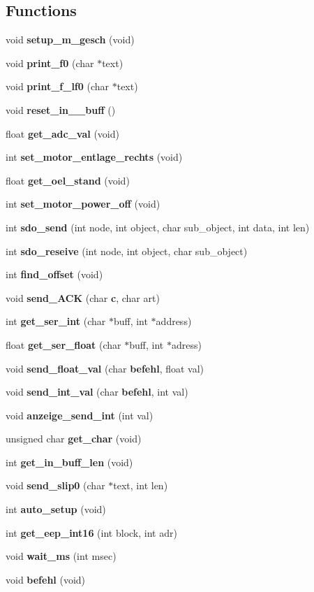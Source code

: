 \subsection*{Functions}
\begin{DoxyCompactItemize}
\item 
void \textbf{ setup\+\_\+m\+\_\+gesch} (void)
\item 
void \textbf{ print\+\_\+f0} (char $\ast$text)
\item 
void \textbf{ print\+\_\+f\+\_\+lf0} (char $\ast$text)
\item 
void \textbf{ reset\+\_\+in\+\_\+\_\+buff} ()
\item 
float \textbf{ get\+\_\+adc\+\_\+val} (void)
\item 
int \textbf{ set\+\_\+motor\+\_\+entlage\+\_\+rechts} (void)
\item 
float \textbf{ get\+\_\+oel\+\_\+stand} (void)
\item 
int \textbf{ set\+\_\+motor\+\_\+power\+\_\+off} (void)
\item 
int \textbf{ sdo\+\_\+send} (int node, int object, char sub\+\_\+object, int data, int len)
\item 
int \textbf{ sdo\+\_\+reseive} (int node, int object, char sub\+\_\+object)
\item 
int \textbf{ find\+\_\+offset} (void)
\item 
void \textbf{ send\+\_\+\+A\+CK} (char \textbf{ c}, char art)
\item 
int \textbf{ get\+\_\+ser\+\_\+int} (char $\ast$buff, int $\ast$address)
\item 
float \textbf{ get\+\_\+ser\+\_\+float} (char $\ast$buff, int $\ast$adress)
\item 
void \textbf{ send\+\_\+float\+\_\+val} (char \textbf{ befehl}, float val)
\item 
void \textbf{ send\+\_\+int\+\_\+val} (char \textbf{ befehl}, int val)
\item 
void \textbf{ anzeige\+\_\+send\+\_\+int} (int val)
\item 
unsigned char \textbf{ get\+\_\+char} (void)
\item 
int \textbf{ get\+\_\+in\+\_\+buff\+\_\+len} (void)
\item 
void \textbf{ send\+\_\+slip0} (char $\ast$text, int len)
\item 
int \textbf{ auto\+\_\+setup} (void)
\item 
int \textbf{ get\+\_\+eep\+\_\+int16} (int block, int adr)
\item 
void \textbf{ wait\+\_\+ms} (int msec)
\item 
void \textbf{ befehl} (void)
\end{DoxyCompactItemize}
